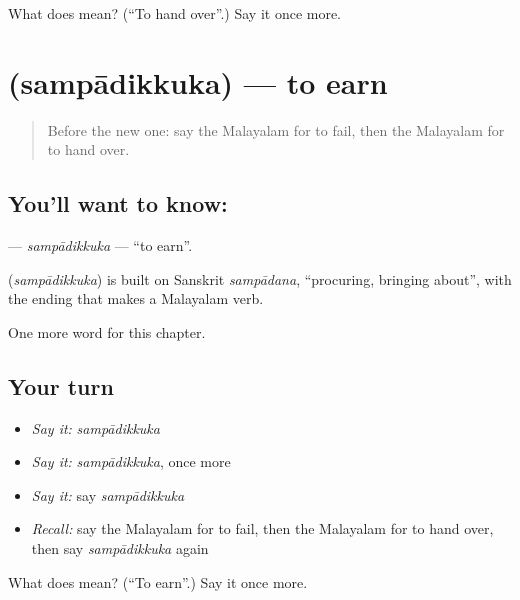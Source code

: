 \begin{tcolorbox}[breakable,colback=teal!4,colframe=teal!35!black,title={Before you move on}]
What does  mean? (\textquotedblleft{}To hand over\textquotedblright{}.) Say it once more.
\end{tcolorbox}
\section[\texorpdfstring{\ml{സമ്പാദിക്കുക} (sampādikkuka)}{സമ്പാദിക്കുക (sampādikkuka)}]{ (sampādikkuka) — to earn}

\label{lesson:ML-C267-sampadikkuka}



\begin{quote}
Before the new one: say the Malayalam for to fail, then the Malayalam for to hand over.
\end{quote}

\subsection*{You'll want to know: }
\textbf{} — \emph{sampādikkuka} — \textquotedblleft{}to earn\textquotedblright{}.

\begin{cousinweb}
\textbf{} (\emph{sampādikkuka}) is built on Sanskrit \emph{sampādana}, \textquotedblleft{}procuring, bringing about\textquotedblright{}, with the ending that makes a Malayalam verb.
\end{cousinweb}

\begin{grammarlens}[title={What you've built}]
One more word for this chapter.
\end{grammarlens}

\subsection*{Your turn}
\begin{itemize}
\raggedright
  \item \emph{Say it:} \emph{sampādikkuka}
  \item \emph{Say it:} \emph{sampādikkuka}, once more
  \item \emph{Say it:} say \emph{sampādikkuka}
  \item \emph{Recall:} say the Malayalam for to fail, then the Malayalam for to hand over, then say \emph{sampādikkuka} again
\end{itemize}

\begin{tcolorbox}[breakable,colback=teal!4,colframe=teal!35!black,title={Before you move on}]
What does  mean? (\textquotedblleft{}To earn\textquotedblright{}.) Say it once more.
\end{tcolorbox}
